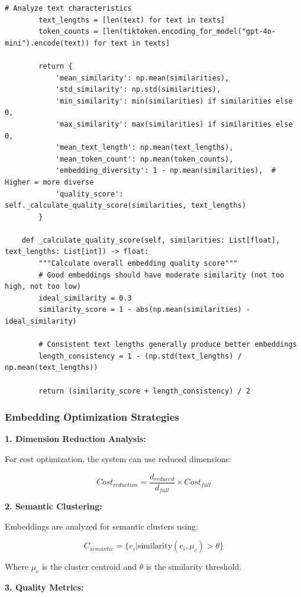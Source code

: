 \documentclass[12pt,a4paper]{article}
\begin{document}
\begin{lstlisting}[caption=Production-Ready Embedding System]
        # Analyze text characteristics
        text_lengths = [len(text) for text in texts]
        token_counts = [len(tiktoken.encoding_for_model("gpt-4o-mini").encode(text)) for text in texts]
        
        return {
            'mean_similarity': np.mean(similarities),
            'std_similarity': np.std(similarities),
            'min_similarity': min(similarities) if similarities else 0,
            'max_similarity': max(similarities) if similarities else 0,
            'mean_text_length': np.mean(text_lengths),
            'mean_token_count': np.mean(token_counts),
            'embedding_diversity': 1 - np.mean(similarities),  # Higher = more diverse
            'quality_score': self._calculate_quality_score(similarities, text_lengths)
        }
    
    def _calculate_quality_score(self, similarities: List[float], text_lengths: List[int]) -> float:
        """Calculate overall embedding quality score"""
        # Good embeddings should have moderate similarity (not too high, not too low)
        ideal_similarity = 0.3
        similarity_score = 1 - abs(np.mean(similarities) - ideal_similarity)
        
        # Consistent text lengths generally produce better embeddings
        length_consistency = 1 - (np.std(text_lengths) / np.mean(text_lengths))
        
        return (similarity_score + length_consistency) / 2
\end{lstlisting}

\subsubsection{Embedding Optimization Strategies}

\textbf{1. Dimension Reduction Analysis:}

For cost optimization, the system can use reduced dimensions:

$$
Cost_{reduction} = \frac{d_{reduced}}{d_{full}} \times Cost_{full}
$$

\textbf{2. Semantic Clustering:}

Embeddings are analyzed for semantic clusters using:

$$
C_{semantic} = \{e_i | \text{similarity}(e_i, \mu_c) > \theta\}
$$

Where $\mu_c$ is the cluster centroid and $\theta$ is the similarity threshold.

\textbf{3. Quality Metrics:}
\end{document}
